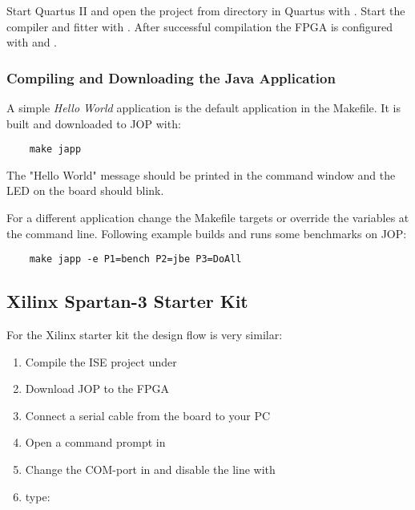 \label{subsubsec:quartus}

Start Quartus II and open the project  from directory
 in Quartus with . Start the compiler and fitter with . After successful compilation the FPGA is
configured with  and .

\subsubsection{Compiling and Downloading the Java Application}

A simple \emph{Hello World} application is the default application
in the Makefile. It is built and downloaded to JOP with:

\begin{verbatim}
    make japp
\end{verbatim}

The "Hello World" message should be printed in the command window
and the LED on the board should blink.

For a different application change the Makefile targets or override
the  variables at the command line. Following example
builds and runs some benchmarks on JOP:

\begin{verbatim}
    make japp -e P1=bench P2=jbe P3=DoAll
\end{verbatim}



\subsection{Xilinx Spartan-3 Starter Kit}

For the Xilinx starter kit the design flow is very similar:

\begin{enumerate}
    \item Compile the ISE project under 
    \item Download JOP to the FPGA
    \item Connect a serial cable from the board to your PC
    \item Open a command prompt in 
    \item Change the COM-port in  and disable the line
    with 
    \item type: 
\end{enumerate}


